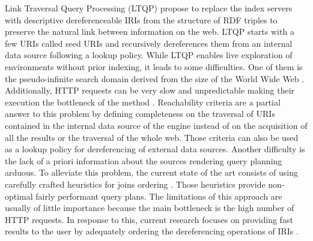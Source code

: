 Link Traversal Query Processing (LTQP) \cite{Hartig2012} propose to replace the index servers with descriptive dereferenceable IRIs 
from the structure of RDF triples to preserve the natural link between information on the web.
LTQP starts with a few URIs called seed URIs and recursively dereferences them from an internal data source following a lookup policy.
While LTQP enables live exploration of environments without prior indexing, it leads to some difficulties.
One of them is the pseudo-infinite search domain derived from the size of the World Wide Web \cite{hartig2016walking}.
Additionally, HTTP requests can be very slow and unpredictable making their execution the bottleneck of the method \cite{hartig2016walking}.
Reachability criteria \cite{Hartig2012} are a partial answer to this problem by defining completeness on the traversal of URIs
contained in the internal data source of the engine instead of on the acquisition of all the results or the traversal of the whole web.
Those criteria can also be used as a lookup policy for dereferencing of external data sources.
Another difficulty is the lack of a priori information about the sources rendering query planning arduous.
To alleviate this problem, the current state of the art consists of using carefully crafted heuristics for joins ordering \cite{Hartig2011}.
Those heuristics provide non-optimal fairly performant query plans.
The limitations of this approach are usually of little importance because the main bottleneck is the high number of HTTP requests.
In response to this, current research focuses on providing fast results to the user by adequately ordering the dereferencing operations of IRIs \cite{hartig2016walking}.


